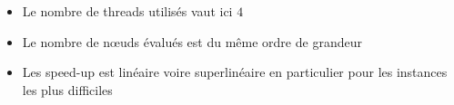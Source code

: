 \documentclass{beamer}
\begin{document}
\begin{frame}
\begin{itemize}
\item Le nombre de threads utilisés vaut ici $4$
\item Le nombre de n\oe uds évalués est du même ordre de grandeur
\item Les speed-up est linéaire voire superlinéaire en particulier pour les instances les plus difficiles
\end{itemize}

%    
% 


\end{frame}
\end{document}
